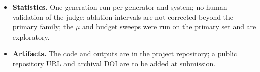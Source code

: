 \begin{itemize}
\item \textbf{Statistics.} One generation run per generator and system; no human validation of the judge; ablation intervals are not corrected beyond the primary family; the $\mu$ and budget sweeps were run on the primary set and are exploratory.
\item \textbf{Artifacts.} The code and outputs are in the project repository; a public repository URL and archival DOI are to be added at submission.
\end{itemize}
